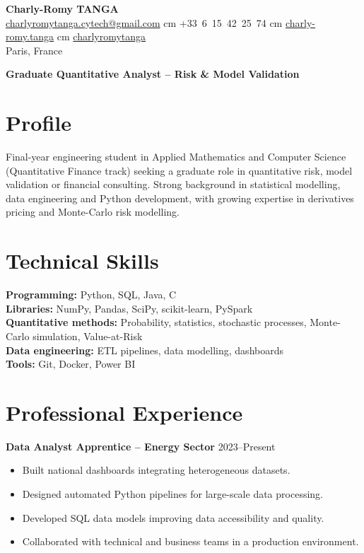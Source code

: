 \documentclass[10pt, letterpaper]{article}
\begin{document}
\begin{center}
    \textbf{\LARGE Charly-Romy TANGA} \\[0.15cm]
    \mbox{\href{mailto:charlyromytanga.cytech@gmail.com}{\footnotesize\faEnvelope\hspace*{0.1cm}charlyromytanga.cytech@gmail.com}}
     cm
    \mbox{\faPhone\hspace*{0.1cm}+33 6 15 42 25 74}
     cm
    \mbox{\href{https://www.linkedin.com/in/charly-romy-tanga}{\footnotesize\faLinkedin\hspace*{0.1cm}charly-romy.tanga}}
     cm
    \mbox{\href{https://github.com/charlyromytanga}{\footnotesize\faGithub\hspace*{0.1cm}charlyromytanga}}
    \\[0.15cm]
    Paris, France
\end{center}

\textbf{Graduate Quantitative Analyst -- Risk \& Model Validation}

\section*{Profile}
Final-year engineering student in Applied Mathematics and Computer Science (Quantitative Finance track) seeking a graduate role in quantitative risk, model validation or financial consulting. Strong background in statistical modelling, data engineering and Python development, with growing expertise in derivatives pricing and Monte-Carlo risk modelling.

\section*{Technical Skills}
\textbf{Programming:} Python, SQL, Java, C\\
\textbf{Libraries:} NumPy, Pandas, SciPy, scikit-learn, PySpark\\
\textbf{Quantitative methods:} Probability, statistics, stochastic processes, Monte-Carlo simulation, Value-at-Risk\\
\textbf{Data engineering:} ETL pipelines, data modelling, dashboards\\
\textbf{Tools:} Git, Docker, Power BI

\section*{Professional Experience}
\textbf{Data Analyst Apprentice -- Energy Sector} \hfill 2023--Present
\begin{itemize}[leftmargin=0.45cm,itemsep=1pt,topsep=2pt]
\item Built national dashboards integrating heterogeneous datasets.
\item Designed automated Python pipelines for large-scale data processing.
\item Developed SQL data models improving data accessibility and quality.
\item Collaborated with technical and business teams in a production environment.
\end{itemize}
\end{document}

